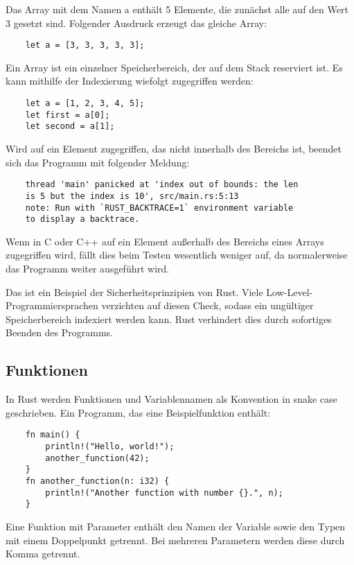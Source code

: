Das Array mit dem Namen \glqq a\grqq{} enthält 5 Elemente, die zunächst alle auf den Wert 3 gesetzt sind. Folgender Ausdruck erzeugt das gleiche Array:

\begin{lstlisting}
    let a = [3, 3, 3, 3, 3];
\end{lstlisting}

Ein Array ist ein einzelner Speicherbereich, der auf dem Stack reserviert ist. Es kann mithilfe der Indexierung wiefolgt zugegriffen werden:

\begin{lstlisting}
    let a = [1, 2, 3, 4, 5];
    let first = a[0];
    let second = a[1];
\end{lstlisting}

Wird auf ein Element zugegriffen, das nicht innerhalb des Bereichs ist, beendet sich das Programm mit folgender Meldung:

\begin{lstlisting}
    thread 'main' panicked at 'index out of bounds: the len
    is 5 but the index is 10', src/main.rs:5:13
    note: Run with `RUST_BACKTRACE=1` environment variable
    to display a backtrace.
\end{lstlisting}

Wenn in C oder C++ auf ein Element außerhalb des Bereichs eines Arrays zugegriffen wird, fällt dies beim Testen wesentlich weniger auf, da normalerweise das Programm weiter ausgeführt wird.

Das ist ein Beispiel der Sicherheitsprinzipien von Rust. Viele Low-Level-Pro\-gram\-mier\-spra\-chen verzichten auf diesen Check, sodass ein ungültiger Speicherbereich indexiert werden kann. Rust verhindert dies durch sofortiges Beenden des Programms.

\subsection{Funktionen}

In Rust werden Funktionen und Variablennamen als Konvention in snake case geschrieben. Ein Programm, das eine Beispielfunktion enthält:

\begin{lstlisting}
    fn main() {
        println!("Hello, world!");
        another_function(42);
    }
    fn another_function(n: i32) {
        println!("Another function with number {}.", n);
    }
\end{lstlisting}

Eine Funktion mit Parameter enthält den Namen der Variable sowie den Typen mit einem Doppelpunkt getrennt. Bei mehreren Parametern werden diese durch Komma getrennt.

